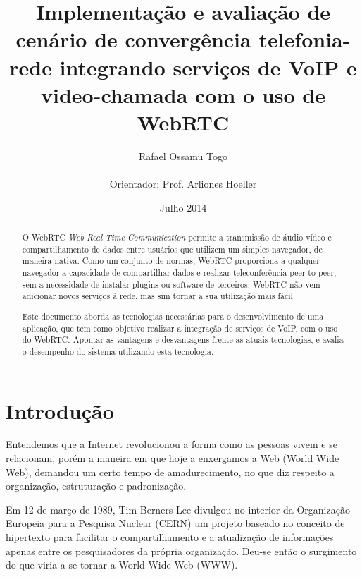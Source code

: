 \documentclass[12pt,a4paper,oneside]{report}
\begin{document}
\title{Implementação e avaliação de cenário de convergência telefonia-rede integrando serviços de VoIP e video-chamada com o uso de WebRTC}
\author{Rafael Ossamu Togo \\ \\ Orientador: Prof. Arliones Hoeller} %
\date{Julho 2014}

\maketitle %

\tableofcontents 

\begin{abstract}
O WebRTC \textit{Web Real Time Communication} permite a transmissão de áudio vídeo e compartilhamento de dados entre usuários que utilizem um simples navegador, de maneira nativa. Como um conjunto de normas, WebRTC proporciona a qualquer navegador a capacidade de compartilhar dados e realizar teleconferência peer to peer, sem a necessidade de instalar plugins ou software de terceiros. WebRTC não vem adicionar novos serviços à
rede, mas sim tornar a sua utilização mais fácil

Este documento aborda as tecnologias necessárias para o desenvolvimento de uma aplicação, que tem como objetivo realizar a integração de serviços de VoIP, com o uso do WebRTC. Apontar as vantagens e desvantagens frente as atuais tecnologias,  e avalia o desempenho do sistema utilizando esta tecnologia.  

\end{abstract}


\chapter{Introdução} %
\label{c_introducao} %
Entendemos que a Internet revolucionou a forma como as pessoas vivem e se relacionam, porém a maneira em que hoje a enxergamos a Web (World Wide Web), demandou um certo tempo de amadurecimento, no que diz respeito a organização, estruturação e padronização.
 
Em 12 de março de 1989, Tim Berners-Lee divulgou no interior da Organização Europeia para a Pesquisa Nuclear (CERN) um projeto baseado no conceito de hipertexto para facilitar o compartilhamento e a atualização de informações apenas entre os pesquisadores da própria organização. Deu-se então o surgimento do que viria a se tornar a World Wide Web (WWW). 
\end{document}
